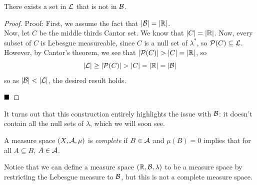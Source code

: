 
\begin{lemma}
    There exists a set in $\cal{L}$ that is not in $\cal{B}$.
\end{lemma}
\begin{proof}{Proof:}
    First, we assume the fact that $\abs{\cal{B}} = \abs{\R}$.\\

    Now, let $C$ be the middle thirds Cantor set. We know that $\abs{C} = \abs{\R}$. Now, every subset of $C$ is Lebesgue measureable, since $C$ is a null set of $\lambda^{*}$, so $\cal{P}(C) \subseteq \cal{L}$. However, by Cantor's theorem, we see that $\abs{\cal{P}(C)} > \abs{C} = \abs{\R}$, so
    \[ \abs{\cal{L}} \geq \abs{\cal{P}(C)} > \abs{C} = \abs{\R} = \abs{\cal{B}} \]
    so as $\abs{\cal{B}} < \abs{\cal{L}}$, the desired result holds. 

    $\qed$
\end{proof}

It turns out that this construction entirely highlights the issue with $\cal{B}$: it doesn't contain all the null sets of $\lambda$, which we will soon see.

\begin{definition}
    A measure space $(X, \cal{A}, \mu)$ is \emph{complete} if $B \in \cal{A}$ and $\mu(B) = 0$ implies that for all $A \subseteq B$, $A \in \cal{A}$. 
\end{definition}

Notice that we can define a measure space $(\R, \cal{B}, \lambda)$ to be a measure space by restricting the Lebesgue measure to $\cal{B}$, but this is not a complete measure space.


